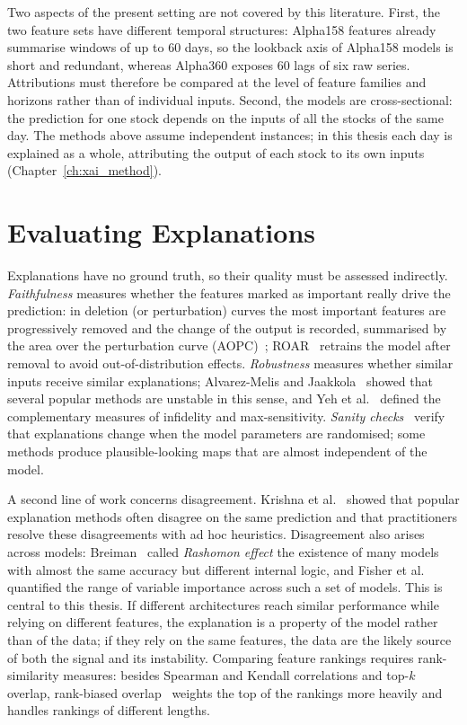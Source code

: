 Two aspects of the present setting are not covered by this literature. First, the two feature sets have different temporal structures: Alpha158 features already summarise windows of up to 60 days, so the lookback axis of Alpha158 models is short and redundant, whereas Alpha360 exposes 60 lags of six raw series. Attributions must therefore be compared at the level of feature families and horizons rather than of individual inputs. Second, the models are cross-sectional: the prediction for one stock depends on the inputs of all the stocks of the same day. The methods above assume independent instances; in this thesis each day is explained as a whole, attributing the output of each stock to its own inputs (Chapter~\ref{ch:xai_method}).

\section{Evaluating Explanations}
\label{sec:rw_eval}

Explanations have no ground truth, so their quality must be assessed indirectly. \emph{Faithfulness} measures whether the features marked as important really drive the prediction: in deletion (or perturbation) curves the most important features are progressively removed and the change of the output is recorded, summarised by the area over the perturbation curve (AOPC)~\cite{samek2017evaluating}; ROAR~\cite{hooker2019benchmark} retrains the model after removal to avoid out-of-distribution effects. \emph{Robustness} measures whether similar inputs receive similar explanations; Alvarez-Melis and Jaakkola~\cite{alvarezmelis2018robustness} showed that several popular methods are unstable in this sense, and Yeh et al.~\cite{yeh2019fidelity} defined the complementary measures of infidelity and max-sensitivity. \emph{Sanity checks}~\cite{adebayo2018sanity} verify that explanations change when the model parameters are randomised; some methods produce plausible-looking maps that are almost independent of the model.

A second line of work concerns disagreement. Krishna et al.~\cite{krishna2024disagreement} showed that popular explanation methods often disagree on the same prediction and that practitioners resolve these disagreements with ad hoc heuristics. Disagreement also arises across models: Breiman~\cite{breiman2001statistical} called \emph{Rashomon effect} the existence of many models with almost the same accuracy but different internal logic, and Fisher et al.~\cite{fisher2019all} quantified the range of variable importance across such a set of models. This is central to this thesis. If different architectures reach similar performance while relying on different features, the explanation is a property of the model rather than of the data; if they rely on the same features, the data are the likely source of both the signal and its instability. Comparing feature rankings requires rank-similarity measures: besides Spearman and Kendall correlations and top-$k$ overlap, rank-biased overlap~\cite{webber2010similarity} weights the top of the rankings more heavily and handles rankings of different lengths.

